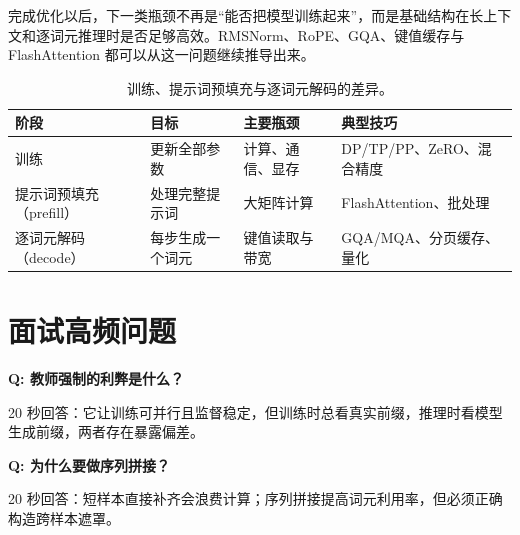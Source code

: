 完成优化以后，下一类瓶颈不再是“能否把模型训练起来”，而是基础结构在长上下文和逐词元推理时是否足够高效。RMSNorm、RoPE、GQA、键值缓存与 FlashAttention 都可以从这一问题继续推导出来。

\begin{table}[htbp]
\centering
\small
\begin{tabularx}{0.9\textwidth}{lYYY}
\toprule
阶段 & 目标 & 主要瓶颈 & 典型技巧\\
\midrule
训练 & 更新全部参数 & 计算、通信、显存 & DP/TP/PP、ZeRO、混合精度\\
提示词预填充（prefill） & 处理完整提示词 & 大矩阵计算 & FlashAttention、批处理\\
逐词元解码（decode） & 每步生成一个词元 & 键值读取与带宽 & GQA/MQA、分页缓存、量化\\
\bottomrule
\end{tabularx}
\caption{训练、提示词预填充与逐词元解码的差异。}
\end{table}

\section*{面试高频问题}

\textbf{Q: 教师强制的利弊是什么？}

20 秒回答：它让训练可并行且监督稳定，但训练时总看真实前缀，推理时看模型生成前缀，两者存在暴露偏差。

\textbf{Q: 为什么要做序列拼接？}

20 秒回答：短样本直接补齐会浪费计算；序列拼接提高词元利用率，但必须正确构造跨样本遮罩。
